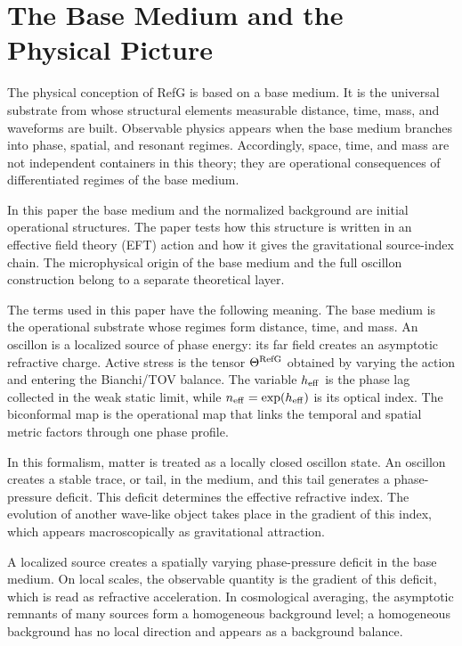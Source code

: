\documentclass[12pt]{article}
\begin{document}
\section{The Base Medium and the Physical Picture}

The physical conception of RefG is based on a base medium. It is the universal substrate from whose structural elements measurable distance, time, mass, and waveforms are built. Observable physics appears when the base medium branches into phase, spatial, and resonant regimes. Accordingly, space, time, and mass are not independent containers in this theory; they are operational consequences of differentiated regimes of the base medium.

In this paper the base medium and the normalized background are initial operational structures. The paper tests how this structure is written in an effective field theory (EFT) action and how it gives the gravitational source-index chain. The microphysical origin of the base medium and the full oscillon construction belong to a separate theoretical layer.

The terms used in this paper have the following meaning. The base medium is the operational substrate whose regimes form distance, time, and mass. An oscillon is a localized source of phase energy: its far field creates an asymptotic refractive charge. Active stress is the tensor $\Theta^{\rm RefG}$ obtained by varying the action and entering the Bianchi/TOV balance. The variable $h_{\rm eff}$ is the phase lag collected in the weak static limit, while $n_{\rm eff}=\exp(h_{\rm eff})$ is its optical index. The biconformal map is the operational map that links the temporal and spatial metric factors through one phase profile.

In this formalism, matter is treated as a locally closed oscillon state. An oscillon creates a stable trace, or tail, in the medium, and this tail generates a phase-pressure deficit. This deficit determines the effective refractive index. The evolution of another wave-like object takes place in the gradient of this index, which appears macroscopically as gravitational attraction.

A localized source creates a spatially varying phase-pressure deficit in the base medium. On local scales, the observable quantity is the gradient of this deficit, which is read as refractive acceleration. In cosmological averaging, the asymptotic remnants of many sources form a homogeneous background level; a homogeneous background has no local direction and appears as a background balance.
\end{document}
